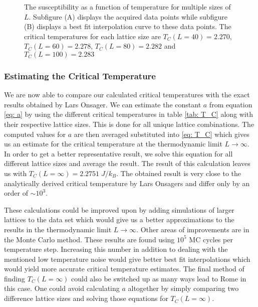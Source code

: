 \documentclass[a4paper, 10pt, reqno]{amsart}
\begin{document}
\begin{figure}
     \centering
     \caption{The susceptibility as a function of temperature for multiple sizes of $L$. Subfigure (A) displays the acquired data points while subfigure (B) displays a best fit interpolation curve to these data points. The critical temperatures for each lattice size are $T_C(L=40)=2.270$, $T_C(L=60)=2.278$, $T_C(L=80)=2.282$ and $T_C(L=100)=2.283$}
     \label{fig: temp SUS}
\end{figure}

\subsubsection{Estimating the Critical Temperature}

We are now able to compare our calculated critical temperatures with the exact results obtained by Lars Onsager. We can estimate the constant $a$ from equation \eqref{eq: a} by using the different critical temperatures in table \ref{tab: T_C} along with their respective lattice sizes. This is done for all unique lattice combinations. The computed values for $a$ are then averaged substituted into \eqref{eq: T_C} which gives us an estimate for the critical temperature at the thermodynamic limit $L \rightarrow \infty$. In order to get a better representative result, we solve this equation for all different lattice sizes and average the result. The result of this calculation leaves us with $T_C(L = \infty) = 2.2751\; J/k_B$. The obtained result is very close to the analytically derived critical temperature by Lars Onsagers and differ only by an order of $\sim 10^3$.

These calculations could be improved upon by adding simulations of larger lattices to the data set which would give us a better approximations to the results in the thermodynamic limit $L \rightarrow \infty$. Other areas of improvements are in the Monte Carlo method. These results are found using $10^5$ MC cycles per temperature step. Increasing this number in addition to dealing with the mentioned low temperature noise would give better best fit interpolations which would yield more accurate critical temperature estimates. The final method of finding $T_C(L=\infty)$ could also be switched up as many ways lead to Rome in this case. One could avoid calculating $a$ altogether by simply comparing two difference lattice sizes and solving those equations for $T_C(L=\infty)$.
\end{document}
